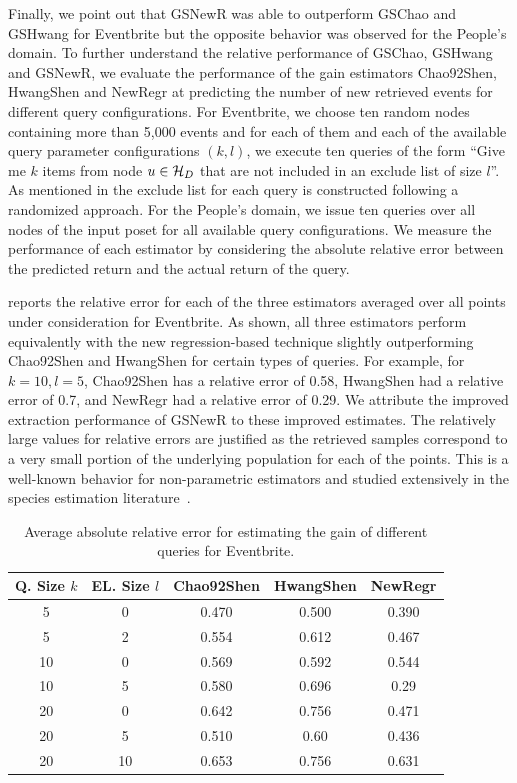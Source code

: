 \vspace{3pt}
Finally, we point out that GSNewR was able to outperform GSChao and GSHwang for Eventbrite but the opposite behavior was observed for the People's domain. To further understand the relative performance of GSChao, GSHwang and GSNewR, we evaluate the performance of the gain estimators Chao92Shen, HwangShen and NewRegr at predicting the number of new retrieved events for different query configurations. For Eventbrite, we choose ten random nodes containing more than 5,000 events and for each of them and each of the available query parameter configurations $(k,l)$, we execute ten queries of the form ``Give me $k$ items from node $u \in \mathcal{H}_D$ that are not included in an exclude list of size $l$''. As mentioned in  the exclude list for each query is constructed following a randomized approach.  For the People's domain, we issue ten queries over all nodes of the input poset for all available query configurations.  We measure the performance of each estimator by considering the absolute relative error between the predicted return and the actual return of the query. 

 reports the relative error for each of the three estimators averaged over all points under consideration for Eventbrite. As shown, all three estimators perform equivalently with the new regression-based technique slightly outperforming Chao92Shen and HwangShen for certain types of queries. For example, for $k = 10, l = 5$, Chao92Shen has a relative error of 0.58, HwangShen had a relative error of 0.7, and NewRegr had a relative error of 0.29. We attribute the improved extraction performance of GSNewR to these improved estimates. The relatively large values for relative errors are justified as the retrieved samples correspond to a very small portion of the underlying population for each of the points. This is a well-known behavior for non-parametric estimators and studied extensively in the species estimation literature~\cite{hwang:2010}. 

\begin{table}
\scriptsize\center
\caption{Average absolute relative error for estimating the gain of different queries for Eventbrite.}
\label{tab:eventesterror}
\begin{tabular}{|c|c|c|c|c|}
\hline
\textbf{Q. Size $k$} & \textbf{EL. Size $l$} & \textbf{Chao92Shen} & \textbf{HwangShen} & \textbf{NewRegr} \\ \hline
5 & 0 & 0.470 & 0.500 & 0.390 \\
5 & 2 & 0.554 & 0.612 & 0.467\\
10 & 0 & 0.569 & 0.592 & 0.544\\
10 & 5 & 0.580 & 0.696 & 0.29\\
20 & 0 & 0.642 & 0.756 &0.471\\
20 & 5 & 0.510 & 0.60 & 0.436 \\
20 & 10 & 0.653 & 0.756 & 0.631\\
\hline
\end{tabular}
\vspace{-10pt}
\end{table}

